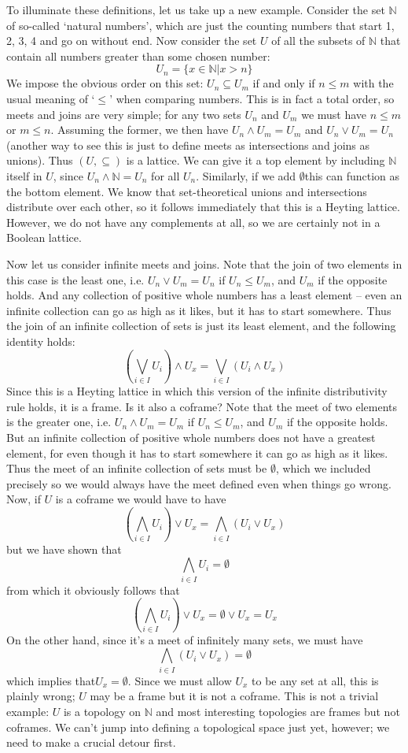 \documentclass[oneside,english]{amsbook}
\numberwithin{section}{chapter}
\theoremstyle{plain}
\theoremstyle{definition}
\begin{document}
To illuminate these definitions, let us take up a new example. Consider the set $\mathbb{N}$ of so-called `natural numbers', which are just the counting numbers that start 1, 2, 3, 4 and go on without end. Now consider the set $U$ of all the subsets of $\mathbb{N}$ that contain all numbers greater than some chosen number: 
	\[ U_{n}=\{x\in\mathbb{N}|x>n\} \]
We impose the obvious order on this set: $U_{n}\subseteq U_{m}$ if and only if $n\le m$ with the usual meaning of `$\le$' when comparing numbers. This is in fact a total order, so meets and joins are very simple; for any two sets $U_{n}$ and $U_{m}$ we must have $n\le m$ or $m\le n$. Assuming the former, we then have $U_{n}\land U_{m}=U_{m}$ and $U_{n}\lor U_{m}=U_{n}$ (another way to see this is just to define meets as intersections and joins as unions). Thus $(U,\subseteq)$ is a lattice. We can give it a top element by including $\mathbb{N}$ itself in $U$, since $U_{n}\land\mathbb{N}=U_{n}$ for all $U_{n}$. Similarly, if we add $\emptyset$this can function as the bottom element. We know that set-theoretical unions and intersections distribute over each other, so it follows immediately that this is a Heyting lattice. However, we do not have any complements at all, so we are certainly not in a Boolean lattice.

Now let us consider infinite meets and joins. Note that the join of two elements in this case is the least one, i.e. $U_{n}\lor U_{m}=U_{n}$ if $U_{n}\le U_{m}$, and $U_{m}$ if the opposite holds. And any collection of positive whole numbers has a least element -- even an infinite collection can go as high as it likes, but it has to start somewhere. Thus the join of an infinite collection of sets is just its least element, and the following identity holds:  
	\[ (\bigvee_{i\in I}U_{i})\land U_{x}=\bigvee_{i\in I}(U_{i}\land U_{x}) \]
Since this is a Heyting lattice in which this version of the infinite distributivity rule holds, it is a frame. Is it also a coframe? Note that the meet of two elements is the greater one, i.e. $U_{n}\land U_{m}=U_{m}$ if $U_{n}\le U_{m}$, and $U_{m}$ if the opposite holds. But an infinite collection of positive whole numbers does not have a greatest element, for even though it has to start somewhere it can go as high as it likes. Thus the meet of an infinite collection of sets must be $\emptyset$, which we included precisely so we would always have the meet defined even when things go wrong. Now, if $U$ is a coframe we would have to have 
	\[ (\bigwedge_{i\in I}U_{i})\lor U_{x}=\bigwedge_{i\in I}(U_{i}\lor U_{x}) \]
but we have shown that 
	\[ \bigwedge_{i\in I}U_{i}=\emptyset \]
from which it obviously follows that 
	\[ (\bigwedge_{i\in I}U_{i})\lor U_{x}=\emptyset\lor U_{x}=U_{x} \]
On the other hand, since it's a meet of infinitely many sets, we must have  
	\[ \bigwedge_{i\in I}(U_{i}\lor U_{x})=\emptyset \]
which implies that$U_{x}=\emptyset$. Since we must allow $U_{x}$ to be any set at all, this is plainly wrong; $U$ may be a frame but it is not a coframe. This is not a trivial example: $U$ is a topology on $\mathbb{N}$ and most interesting topologies are frames but not coframes. We can't jump into defining a topological space just yet, however; we need to make a crucial detour first.
\end{document}
